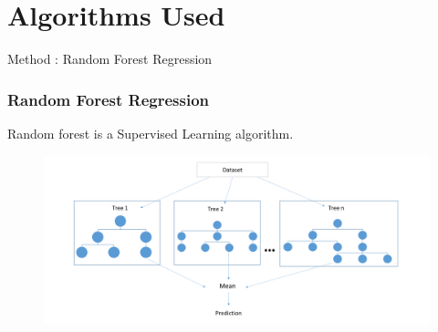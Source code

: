\documentclass[11pt]{beamer}
\begin{document}
	\section{Algorithms Used }
		\begin{frame}{Method : Random Forest Regression}
		\frametitle{Random Forest Regression}
		
		Random forest is a Supervised Learning algorithm.
		\begin{figure}
			\includegraphics[width=\linewidth,height=0.5\linewidth]{Random_forest}
			
		\end{figure}
	
		

		
	\end{frame}	
\end{document}
